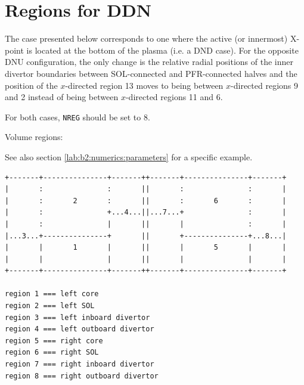 \documentclass[a4paper,10pt]{report}
\begin{document}
\clearpage
\section{Regions for DDN}

The case presented below corresponds to one where the active (or innermost)
X-point is located at the bottom of the plasma (i.e. a DND case). For the
opposite DNU configuration, the only change is the relative radial positions
of the inner divertor boundaries between SOL-connected and PFR-connected
halves and the position of the $x$-directed region 13 moves to being between
$x$-directed regions 9 and 2 instead of being between $x$-directed regions 11 and 6.

For both cases, {\tt NREG} should be set to $8$.

Volume regions:

See also section \ref{lab:b2:numerics:parameters} for a specific example.

\begin{verbatim}
+-------+---------------+-------++-------+---------------+-------+
|       :               :       ||       :               :       |
|       :       2       :       ||       :       6       :       |
|       :               +...4...||...7...+               :       |
|       :               |       ||       |               :       |
|...3...+---------------+       ||       +---------------+...8...|
|       |       1       |       ||       |       5       |       |
|       |               |       ||       |               |       |
+-------+---------------+-------++-------+---------------+-------+

region 1 === left core
region 2 === left SOL
region 3 === left inboard divertor
region 4 === left outboard divertor
region 5 === right core
region 6 === right SOL
region 7 === right inboard divertor
region 8 === right outboard divertor
\end{verbatim}
\end{document}
